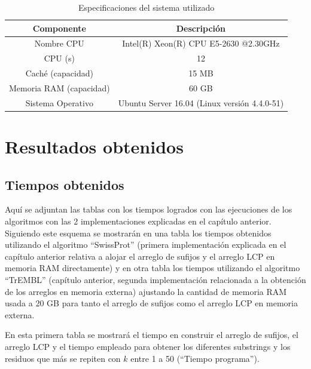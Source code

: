 \begin{table}[h]
\centering
\begin{tabular}{|c|c|}
\hline
\textbf{Componente}     & \textbf{Descripción}                         \\ \hline
Nombre CPU              & Intel(R) Xeon(R) CPU E5-2630 @2.30GHz        \\
CPU (s)                 & 12                                           \\
Caché (capacidad)       & 15 MB                                        \\
Memoria RAM (capacidad) & 60 GB                                        \\
Sistema Operativo       & Ubuntu Server 16.04 (Linux versión 4.4.0-51) \\ \hline
\end{tabular}
\caption{Especificaciones del sistema utilizado}
\label{tb:labelr2}
\end{table}

\section{Resultados obtenidos}

\subsection{Tiempos obtenidos}

Aquí se adjuntan las tablas con los tiempos logrados con las ejecuciones de los algoritmos con las 2 implementaciones explicadas en el capítulo anterior. Siguiendo este esquema se mostrarán en una tabla los tiempos obtenidos utilizando el algoritmo ``SwissProt'' (primera implementación explicada en el capítulo anterior relativa a alojar el arreglo de sufijos y el arreglo LCP en memoria RAM directamente) y en otra tabla los tiempos utilizando el algoritmo ``TrEMBL'' (capítulo anterior, segunda implementación relacionada a la obtención de los arreglos en memoria externa) ajustando la cantidad de memoria RAM usada a 20 GB para tanto el arreglo de sufijos como el arreglo LCP en memoria externa. 

En esta primera tabla se mostrará el tiempo en construir el arreglo de sufijos, el arreglo LCP y el tiempo empleado para obtener los diferentes substrings y los residuos que más se repiten con $k$ entre 1 a 50 (``Tiempo programa'').

